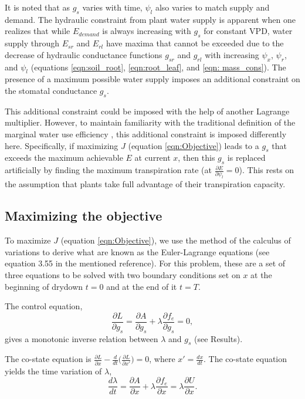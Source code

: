\documentclass[utf8]{frontiersSCNS} %
\begin{document}
It is noted that as $g_s$ varies with time, $\psi_l$ also varies to match supply and demand. The hydraulic constraint from plant water supply is apparent when one realizes that while $E_{demand}$ is always increasing with $g_s$ for constant VPD, water supply through $E_{sr}$ and $E_{rl}$ have maxima that cannot be exceeded due to the decrease of hydraulic conductance functions $g_{sr}$ and $g_{rl}$ with increasing $\psi_x$, $\psi_r$, and $\psi_l$ (equations \ref{eqn:soil_root}, \ref{eqn:root_leaf}, and \ref{eqn: mass_cons}). The presence of a maximum possible water supply imposes an additional constraint on the stomatal conductance $g_s$. 

This additional constraint could be imposed with the help of another Lagrange multiplier. However, to maintain familiarity with the traditional definition of the marginal water use efficiency \citep{cowan1977}, this additional constraint is imposed differently here. Specifically, if maximizing $J$ (equation \ref{eqn:Objective}) leads to a $g_s$ that exceeds the maximum achievable $E$ at current $x$, then this $g_s$ is replaced artificially by finding the maximum transpiration rate \Big(at $\frac{\partial E}{\partial \psi_l} = 0$\Big). This rests on the assumption that plants take full advantage of their transpiration capacity.

\subsection{Maximizing the objective}

To maximize $J$ (equation \ref{eqn:Objective}), we use the method of the calculus of variations \citep{witelski2015} to derive what are known as the Euler-Lagrange equations (see equation 3.55 in the mentioned reference). For this problem, these are a set of three equations to be solved with two boundary conditions set on $x$ at the beginning of drydown $t=0$ and at the end of it $t=T$.

The control equation,
\begin{equation}
    \label{eqn:control}
    \frac{\partial L}{\partial g_s} = \frac{\partial A}{\partial g_s} + \lambda \frac{\partial f_e}{\partial g_s} = 0,
\end{equation}
gives a monotonic inverse relation between $\lambda$ and $g_s$ (see Results).

The co-state equation is $\frac{\partial L}{\partial x} - \frac{d}{dt} \Big(\frac{\partial L}{\partial x'} \Big) = 0$, where $x'= \frac{dx}{dt}$. The co-state equation yields the time variation of $\lambda$,
\begin{equation}
    \label{eqn:co_state}
    \frac{d \lambda}{dt} = \frac{\partial A}{\partial x} + \lambda \frac{\partial f_e}{\partial x} = \lambda \frac{\partial U}{\partial x}.
\end{equation}
\end{document}
